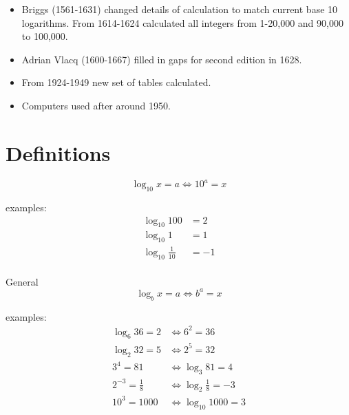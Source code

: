\documentclass{exam}
\begin{document}
  \begin{itemize}
    \item Briggs (1561-1631) changed details of calculation to match current base 10 logarithms.  From 1614-1624
      calculated all integers from 1-20,000 and 90,000 to 100,000.  

    \item Adrian Vlacq (1600-1667) filled in gaps for second edition in 1628.

    \item From 1924-1949 new set of tables calculated.

    \item Computers used after around 1950.
  \end{itemize}

  \pagebreak

  \section{Definitions}

  \[
    \log_{10} x = a \Longleftrightarrow 10^a = x
  \]

  examples:
  \begin{align*}
    \log_{10} 100 &= 2 \\
    \log_{10} 1 &= 1 \\
    \log_{10} \frac{1}{10} &= -1 \\
  \end{align*}

  General
  \[
    \log_b x = a \Longleftrightarrow b^a = x
  \]

  examples:
  \begin{align*}
    \log_6 36 = 2 & \Longleftrightarrow 6^2 = 36 \\
    \log_2 32 = 5 & \Longleftrightarrow 2^5 = 32 \\
    3^4 = 81 & \Longleftrightarrow \log_3 81 = 4 \\
    2^{-3} = \frac{1}{8} & \Longleftrightarrow \log_2 \frac{1}{8} = -3 \\
    10^3 = 1000 & \Longleftrightarrow \log_{10} 1000 = 3 \\
  \end{align*}
\end{document}
